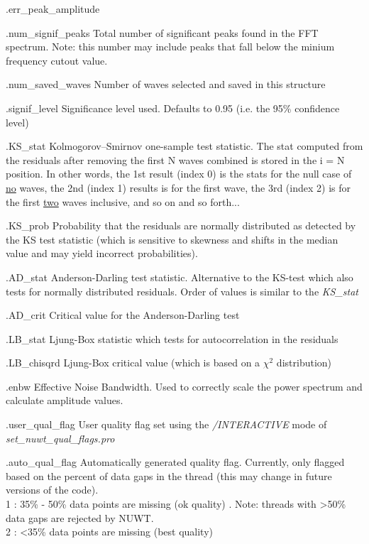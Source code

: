 \documentclass{article}
\begin{document}
\begin{labeling}{.err\_peak\_amplitude}
\item[.num\_signif\_peaks] Total number of significant peaks found in the FFT spectrum. Note: this number may include peaks that fall below the minium frequency cutout value. 
\item[.num\_saved\_waves] Number of waves selected and saved in this structure 
\item[.signif\_level] Significance level used. Defaults to 0.95 (i.e. the 95\% confidence level)
\item[.KS\_stat] Kolmogorov–Smirnov one-sample test statistic. The stat computed from the residuals after removing the first N waves combined is stored in the i = N position. In other words, the 1st result (index 0) is the stats for the null case of \underline{no} waves, the 2nd (index 1) results is for the first wave, the 3rd (index 2) is for the first \underline{two} waves inclusive, and so on and so forth...
\item[.KS\_prob] Probability that the residuals are normally distributed as detected by the KS test statistic (which is sensitive to skewness and shifts in the median value and may yield incorrect probabilities).
\item[.AD\_stat] Anderson-Darling test statistic. Alternative to the KS-test which also tests for normally distributed residuals. Order of values is similar to the \textit{KS\_stat}
\item[.AD\_crit] Critical value for the Anderson-Darling test
\item[.LB\_stat] Ljung-Box statistic which tests for autocorrelation in the residuals  
\item[.LB\_chisqrd] Ljung-Box critical value (which is based on a $\chi^2$ distribution)
\item[.enbw] Effective Noise Bandwidth. Used to correctly scale the power spectrum and calculate amplitude values.
\item[.user\_qual\_flag] User quality flag set using the \textit{/INTERACTIVE} mode of \textit{set\_nuwt\_qual\_flags.pro}
\item[.auto\_qual\_flag] Automatically generated quality flag. Currently, only flagged based on the percent of data gaps in the thread (this may change in future versions of the code). \\
1 : 35\% - 50\% data points are missing (ok quality) . Note: threads with \textgreater 50\% data gaps are rejected by NUWT.\\
2 : \textless 35\% data points are missing (best quality)
\end{labeling}
\end{document}
